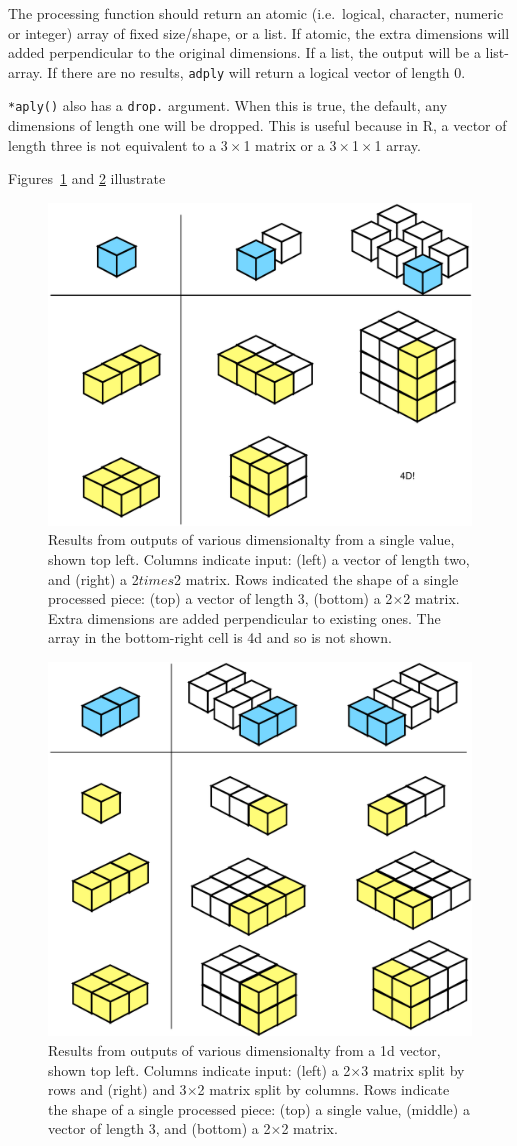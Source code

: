 \documentclass[letterpage]{scrartcl}
\newcommand{\code}[1]{\lstinline!#1!}
\newcommand{\f}[1]{\lstinline!#1()!}
\begin{document}
The processing function should return an atomic (i.e.\ logical, character, numeric or integer) array of fixed size/shape, or a list.  If atomic, the extra dimensions will added perpendicular to the original dimensions.  If a list, the output will be a list-array. If there are no results, {\tt adply} will return a logical vector of length 0.

\f{*aply} also has a \code{drop.} argument.  When this is true, the default, any dimensions of length one will be dropped.  This is useful because in R, a vector of length three is not equivalent to a 3\,$\times$\,1 matrix or a 3\,$\times$\,1\,$\times$\,1 array.

Figures~\ref{fig:function-1d} and \ref{fig:function-2d} illustrate 

\begin{figure}[htbp]
  \centering
  \includegraphics[width= 0.45 \textwidth]{function-1d}
  \caption{Results from outputs of various dimensionalty from a single value, shown top left.  Columns indicate input: (left) a vector of length two, and (right) a 2$times$2 matrix.  Rows indicated the shape of a single processed piece: (top) a vector of length 3, (bottom) a 2$\times$2 matrix.  Extra dimensions are added perpendicular to existing ones.  The array in the bottom-right cell is 4d and so is not shown.}
  \label{fig:function-1d}
\end{figure}

\begin{figure}[htbp]
  \centering
  \includegraphics[width= 0.45 \textwidth]{function-2d}
  \caption{Results from outputs of various dimensionalty from a 1d vector, shown top left.  Columns indicate input: (left) a 2$\times$3 matrix split by rows and (right) and 3$\times$2 matrix split by columns.  Rows indicate the shape of a single processed piece: (top) a single value, (middle) a vector of length 3, and (bottom) a 2$\times$2 matrix.}
  \label{fig:function-2d}
\end{figure}
\end{document}
